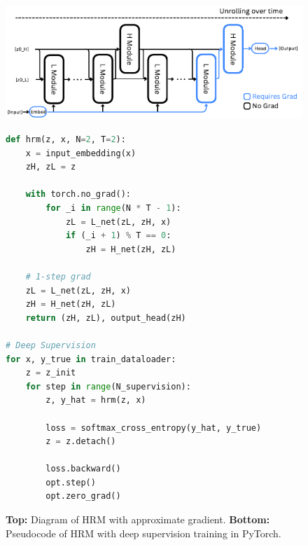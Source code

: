\begin{figure}
  \vspace{-0.3in}
  \centering
  \begin{minipage}[t]{\linewidth}
    \includegraphics[width=\linewidth]{figures/pseudocode/HRMDiagram.pdf}
    \begin{lstlisting}[language=python]
def hrm(z, x, N=2, T=2):
    x = input_embedding(x)
    zH, zL = z

    with torch.no_grad():
        for _i in range(N * T - 1):
            zL = L_net(zL, zH, x)
            if (_i + 1) % T == 0:
                zH = H_net(zH, zL)

    # 1-step grad
    zL = L_net(zL, zH, x)
    zH = H_net(zH, zL)
    return (zH, zL), output_head(zH)

# Deep Supervision
for x, y_true in train_dataloader:
    z = z_init
    for step in range(N_supervision):
        z, y_hat = hrm(z, x)
        
        loss = softmax_cross_entropy(y_hat, y_true)
        z = z.detach()

        loss.backward()
        opt.step()
        opt.zero_grad()
    \end{lstlisting}
  \end{minipage}
  \vspace{-0.15in}
  \caption{\textbf{Top:} Diagram of HRM with approximate gradient. \textbf{Bottom:} Pseudocode of HRM with deep supervision training in PyTorch.}
  \label{fig:pseudocode}
\end{figure}